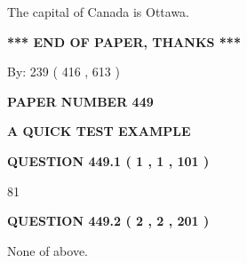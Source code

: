 \documentclass[12pt]{article}
\begin{document}
  
 
 
\noindent{}
 
 
The capital of Canada is Ottawa.
 
 
 
 
   
   
 \vspace{0.2in}
 
   
   
   
   
\vspace{1.0in} 
{\textbf{\large{ *** END OF PAPER, THANKS *** }}} 
   
   
\hspace{1.0in} By: 
 239 ( 416 ,  613 )
   
   
   
   
\newpage 
\setcounter{page}{ 
   449001 } 
   
   
   
   
 {\textbf{ \Large{ PAPER NUMBER  449  }}}
   
   
\vspace{0.2in}
   
   
   
   
   
   
 \vspace{0.2in}
{\LARGE {\textbf{ A QUICK TEST EXAMPLE}}}
   
   
  
\vspace{0.2in}
  
{\textbf{\Large{QUESTION
449.1 
 ( 1 , 1 , 101 )
}}}
  
  
 
 
\noindent{}

81
 
 
  
\vspace{0.2in}
  
{\textbf{\Large{QUESTION
449.2 
 ( 2 , 2 , 201 )
}}}
  
  
 
 
\noindent{}
 
 
 None of above.
 
\end{document}
